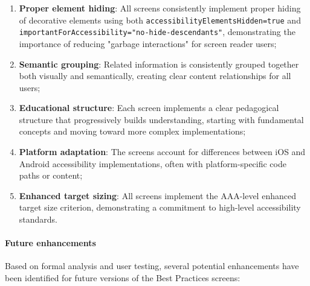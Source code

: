 \begin{enumerate}
    \item \textbf{Proper element hiding}: All screens consistently implement proper hiding of decorative elements using both \texttt{accessibilityElementsHidden=true} and \\\texttt{importantForAccessibility="no-hide-descendants"}, demonstrating the importance of reducing "garbage interactions" for screen reader users;
    
    \item \textbf{Semantic grouping}: Related information is consistently grouped together both visually and semantically, creating clear content relationships for all users;
    
    \item \textbf{Educational structure}: Each screen implements a clear pedagogical structure that progressively builds understanding, starting with fundamental concepts and moving toward more complex implementations;
    
    \item \textbf{Platform adaptation}: The screens account for differences between iOS and Android accessibility implementations, often with platform-specific code paths or content;
    
    \item \textbf{Enhanced target sizing}: All screens implement the AAA-level enhanced target size criterion, demonstrating a commitment to high-level accessibility standards.
\end{enumerate}

\paragraph{Future enhancements}

Based on formal analysis and user testing, several potential enhancements have been identified for future versions of the Best Practices screens:

